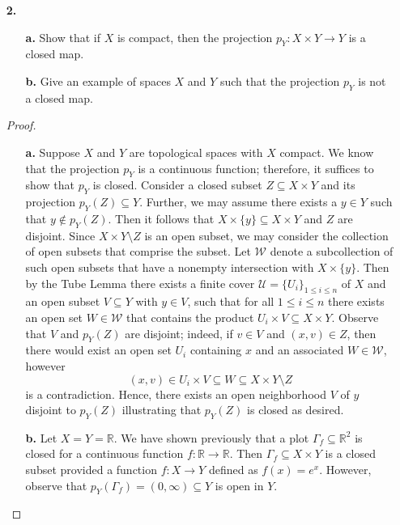\documentclass[ 12pt ]{article}
\begin{document}
\begin{enumerate}
	\item[\textbf{2.}]
		\begin{enumerate}
			\item[\textbf{a.}] Show that if $X$ is compact, then the projection $p_Y : X \times Y \to Y$ is a closed map.
			\item[\textbf{b.}] Give an example of spaces $X$ and $Y$ such that the projection $p_Y$ is not a closed map.
		\end{enumerate}

		\begin{proof} $ $
			\begin{enumerate}
				\item[\textbf{a.}] Suppose $X$ and $Y$ are topological spaces with $X$ compact. We know that the projection $p_Y$ is a continuous function; therefore, it suffices to
					show that $p_Y$ is closed. Consider a closed subset $Z \subseteq X \times Y$ and its projection $p_Y(Z) \subseteq Y$. Further, we may assume there exists a $y \in Y$
					such that $y \notin p_Y(Z)$. Then it follows that $X \times \{ y \} \subseteq X \times Y$ and $Z$ are disjoint. Since $X \times Y \setminus Z$ is an open subset, we
					may consider the collection of open subsets that comprise the subset. Let $\mathcal{W}$ denote a subcollection of such open subsets that have a nonempty intersection
					with $X \times \{ y \}$. Then by the Tube Lemma there exists a finite cover $\mathcal{U} = \{ U_i \}_{1 \leq i \leq n}$ of $X$ and an open subset $V \subseteq Y$
					with $y \in V$, such that for all $1 \leq i \leq n$ there exists an open set $W \in \mathcal{W}$ that contains the product $U_i \times V \subseteq X \times Y$.
					Observe that $V$ and $p_Y(Z)$ are disjoint; indeed, if $v \in V$ and $(x, v) \in Z$, then there would exist an open set $U_i$ containing $x$ and an associated $W \in
					\mathcal{W}$, however $$(x, v) \in U_i \times V \subseteq W \subseteq X \times Y \setminus Z$$ is a contradiction. Hence, there exists an open neighborhood $V$ of
					$y$ disjoint to $p_Y(Z)$ illustrating that $p_Y(Z)$ is closed as desired.

				\item[\textbf{b.}] Let $X = Y = \mathbb{R}$. We have shown previously that a plot $\Gamma_f \subseteq \mathbb{R}^2$ is closed for a continuous function $f : \mathbb{R}
					\to \mathbb{R}$. Then $\Gamma_f \subseteq X \times Y$ is a closed subset provided a function $f : X \to Y$ defined as $f(x) = e^x$. However, observe that $p_Y(
					\Gamma_f) = (0, \infty) \subseteq Y$ is open in $Y$.
			\end{enumerate}
		\end{proof}



\end{enumerate}
\end{document}
